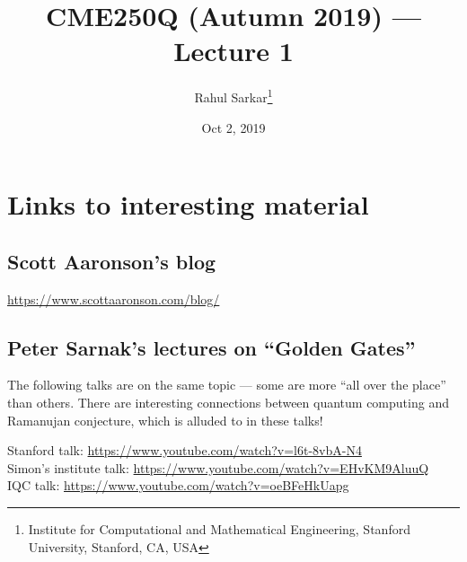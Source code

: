 \documentclass[10pt]{article}
\title{CME250Q (Autumn 2019) --- Lecture 1}
\author{Rahul Sarkar\footnote{Institute for Computational and Mathematical Engineering, Stanford University, Stanford, CA, USA}}
\date{Oct 2, 2019}
\theoremstyle{plain}
\theoremstyle{definition}
\begin{document}
\maketitle


\section{Links to interesting material}

\subsection{Scott Aaronson's blog}
\url{https://www.scottaaronson.com/blog/}

\subsection{Peter Sarnak's lectures on ``Golden Gates''}

The following talks are on the same topic --- some are more ``all over the place'' than others. There are interesting connections between quantum computing and Ramanujan conjecture, which is alluded to in these talks!

Stanford talk: \url{https://www.youtube.com/watch?v=l6t-8vbA-N4}\\
Simon's institute talk: \url{https://www.youtube.com/watch?v=EHvKM9AluuQ}\\
IQC talk: \url{https://www.youtube.com/watch?v=oeBFeHkUapg}
\end{document}
